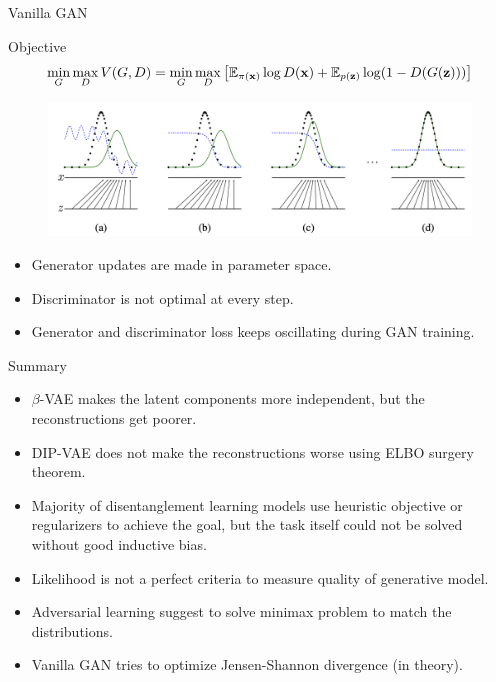 \begin{frame}{Vanilla GAN}
	\begin{block}{Objective}
		\vspace{-0.4cm}
		\[
		\min_{G} \max_D V(G, D) = \min_{G} \max_D \left[ \mathbb{E}_{\pi(\mathbf{x})} \log D(\mathbf{x}) + \mathbb{E}_{p(\mathbf{z})} \log (1 - D(G(\mathbf{z}))) \right]
		\]
		\vspace{-0.4cm}
	\end{block}

	\begin{figure}
		\centering
		\includegraphics[width=1.0\linewidth]{figs/gan_1}
	\end{figure}
	\begin{itemize}
		\item Generator updates are made in parameter space.
		\item Discriminator is not optimal at every step.
		\item Generator and discriminator loss keeps oscillating during GAN training.
	\end{itemize}

\end{frame}
\begin{frame}{Summary}
	\begin{itemize}
		\item $\beta$-VAE makes the latent components more independent, but the reconstructions get poorer.
		\vfill
		\item DIP-VAE does not make the reconstructions worse using ELBO surgery theorem.
		\vfill
		\item Majority of disentanglement learning models use heuristic objective or regularizers to achieve the goal, but the task itself could not be solved without good inductive bias.
		\vfill
		\item Likelihood is not a perfect criteria to measure quality of generative model.
		\vfill
		\item Adversarial learning suggest to solve minimax problem to match the distributions.
		\vfill
		\item Vanilla GAN tries to optimize Jensen-Shannon divergence (in theory).
	\end{itemize}
\end{frame}
 